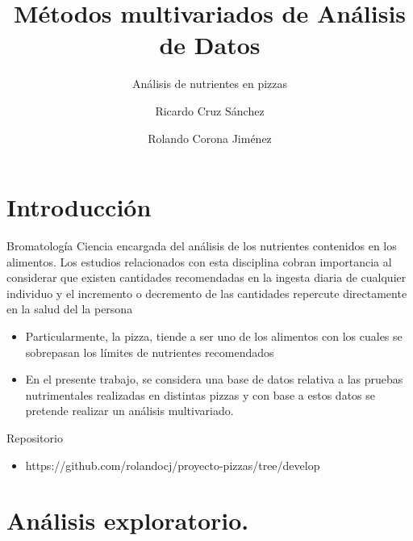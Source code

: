 \documentclass[pdf]{beamer}
\title{Métodos multivariados de Análisis de Datos}
\subtitle{Análisis de nutrientes en pizzas}
\author{
Ricardo Cruz Sánchez \\
  \and
Rolando Corona Jiménez
}
\institute[CIMAT]{CIMAT}
\begin{document}
\begin{frame}
\titlepage
\end{frame}




\section{Introducción}
\begin{frame}{Bromatología}
Ciencia encargada del análisis de los nutrientes contenidos en los alimentos. Los estudios relacionados con esta disciplina cobran importancia al considerar que existen cantidades recomendadas en la ingesta diaria de cualquier individuo y el incremento o decremento de las cantidades repercute directamente en la salud del la persona
\end{frame}

\begin{frame}{}
\begin{itemize}

\item Particularmente, la pizza, tiende a ser uno de los alimentos con los cuales se sobrepasan los límites de nutrientes recomendados\\
\item En el presente trabajo, se considera una base de datos relativa a las pruebas nutrimentales realizadas en distintas pizzas y con base a estos datos se pretende realizar un análisis multivariado.
\end{itemize}

\end{frame}


\begin{frame}{Repositorio}
\begin{itemize}

\item https://github.com/rolandocj/proyecto-pizzas/tree/develop
\end{itemize}

\end{frame}



\section{Análisis exploratorio.}
\end{document}
